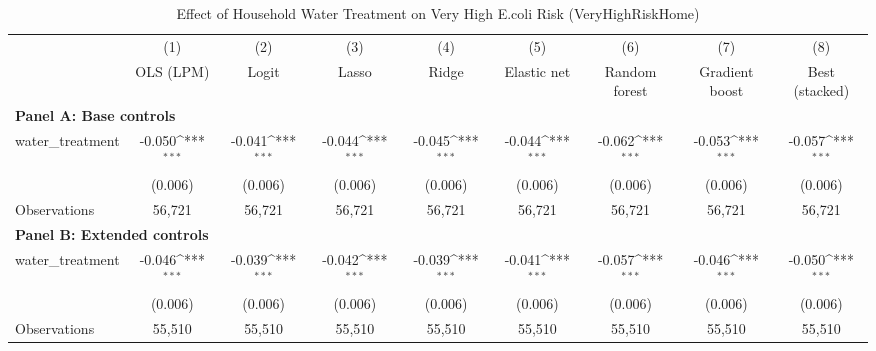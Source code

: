 \begin{table}[htbp]\centering
\caption{Effect of Household Water Treatment on Very High E.coli Risk (VeryHighRiskHome)}
\newcommand{\sym}[1]{\ifmmode^{#1}\else\(^{#1}\)\fi}
\begin{tabular}{l*{8}{c}}
\toprule
            &\multicolumn{1}{c}{(1)}&\multicolumn{1}{c}{(2)}&\multicolumn{1}{c}{(3)}&\multicolumn{1}{c}{(4)}&\multicolumn{1}{c}{(5)}&\multicolumn{1}{c}{(6)}&\multicolumn{1}{c}{(7)}&\multicolumn{1}{c}{(8)}\\
            &\multicolumn{1}{c}{OLS (LPM)}&\multicolumn{1}{c}{Logit}&\multicolumn{1}{c}{Lasso}&\multicolumn{1}{c}{Ridge}&\multicolumn{1}{c}{Elastic net}&\multicolumn{1}{c}{Random forest}&\multicolumn{1}{c}{Gradient boost}&\multicolumn{1}{c}{Best (stacked)}\\
\multicolumn{9}{l}{\textbf{Panel A: Base controls}}\\
\midrule
water\_treatment&      -0.050\sym{***}&      -0.041\sym{***}&      -0.044\sym{***}&      -0.045\sym{***}&      -0.044\sym{***}&      -0.062\sym{***}&      -0.053\sym{***}&      -0.057\sym{***}\\
            &     (0.006)         &     (0.006)         &     (0.006)         &     (0.006)         &     (0.006)         &     (0.006)         &     (0.006)         &     (0.006)         \\
\midrule
Observations&      56,721         &      56,721         &      56,721         &      56,721         &      56,721         &      56,721         &      56,721         &      56,721         \\

\midrule
\multicolumn{9}{l}{\textbf{Panel B: Extended controls}}\\
\midrule

water\_treatment&      -0.046\sym{***}&      -0.039\sym{***}&      -0.042\sym{***}&      -0.039\sym{***}&      -0.041\sym{***}&      -0.057\sym{***}&      -0.046\sym{***}&      -0.050\sym{***}\\
            &     (0.006)         &     (0.006)         &     (0.006)         &     (0.006)         &     (0.006)         &     (0.006)         &     (0.006)         &     (0.006)         \\
\midrule
Observations&      55,510         &      55,510         &      55,510         &      55,510         &      55,510         &      55,510         &      55,510         &      55,510         \\
\bottomrule\end{tabular}\end{table}
